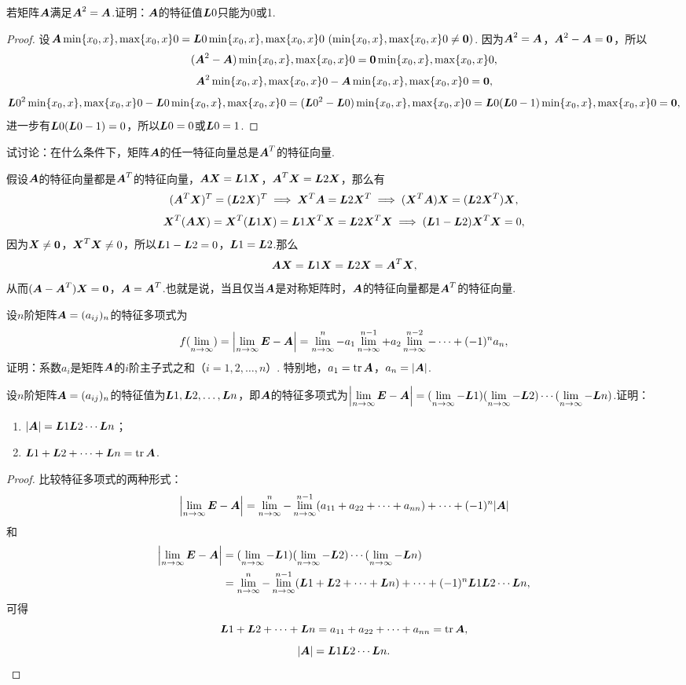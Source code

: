 \begin{example}
若矩阵\(\A\)满足\(\A^2=\A\).证明：\(\A\)的特征值\(\L0\)只能为0或1.
\begin{proof}
设\(\A\X0=\L0\X0\ (\X0\neq\z)\).
因为\(\A^2=\A\)，\(\A^2-\A=\z\)，所以\[
(\A^2-\A)\X0=\z\X0,
\]\[
\A^2\X0-\A\X0=\z,
\]\[
\L0^2\X0-\L0\X0=(\L0^2-\L0)\X0=\L0(\L0-1)\X0=\z,
\]进一步有\(\L0(\L0-1)=0\)，所以\(\L0=0\)或\(\L0=1\).
\end{proof}
\end{example}

\begin{example}
试讨论：在什么条件下，矩阵\(\A\)的任一特征向量总是\(\A^T\)的特征向量.
\begin{solution}
假设\(\A\)的特征向量都是\(\A^T\)的特征向量，\(\A\x=\L{1}\x\)，\(\A^T\x=\L{2}\x\)，那么有\[
(\A^T\x)^T=(\L{2}\x)^T
\implies
\x^T\A=\L{2}\x^T
\implies
(\x^T\A)\x=(\L{2}\x^T)\x,
\]\[
\x^T(\A\x)=\x^T(\L{1}\x)=\L{1}\x^T\x=\L{2}\x^T\x
\implies
(\L{1}-\L{2})\x^T\x=0,
\]
因为\(\x\neq\z\)，\(\x^T\x\neq0\)，所以\(\L{1}-\L{2}=0\)，\(\L{1}=\L{2}\).那么\[
\A\x=\L{1}\x=\L{2}\x=\A^T\x,
\]从而\((\A-\A^T)\x=\z\)，\(\A=\A^T\).也就是说，当且仅当\(\A\)是对称矩阵时，\(\A\)的特征向量都是\(\A^T\)的特征向量.
\end{solution}
\end{example}

\begin{example}
设\(n\)阶矩阵\(\A=(a_{ij})_n\)的特征多项式为\[
f(\l) = \abs{\l\E-\A}
= \l^n - a_1 \l^{n-1} + a_2 \l^{n-2} - \dotsb + (-1)^n a_n,
\]证明：系数\(a_i\)是矩阵\(\A\)的\(i\)阶主子式之和（\(i=1,2,\dotsc,n\)）.
特别地，\(a_1 = \tr\A\)，\(a_n = \abs{\A}\).
\end{example}

\begin{example}
设\(n\)阶矩阵\(\A=(a_{ij})_n\)的特征值为\(\L{1},\L{2},\dotsc,\L{n}\)，即\(\A\)的特征多项式为\(\abs{\l\E-\A}=(\l-\L{1})(\l-\L{2})\dotsm(\l-\L{n})\).证明：
\begin{enumerate}
\item \(\abs{\A} = \L{1} \L{2} \dotsm \L{n}\)；
\item \(\L{1} + \L{2} + \dotsb + \L{n} = \tr\A\).
\end{enumerate}
\begin{proof}
比较特征多项式的两种形式：\[
\abs{\l\E-\A}=\l^n-\l^{n-1}(a_{11}+a_{22}+ \dotsb +a_{nn})+ \dotsb +(-1)^n\abs{\A}
\]和\begin{align*}
\abs{\l\E-\A} &= (\l-\L{1})(\l-\L{2})\dotsm(\l-\L{n}) \\
&= \l^n-\l^{n-1}(\L{1}+\L{2}+ \dotsb +\L{n}) + \dotsb + (-1)^n \L{1} \L{2} \dotsm \L{n},
\end{align*}可得\[
\L{1} + \L{2} + \dotsb + \L{n} = a_{11} + a_{22} + \dotsb + a_{nn} = \tr\A,
\]\[
\abs{\A} = \L{1} \L{2} \dotsm \L{n}.
\qedhere
\]
\end{proof}
\end{example}

